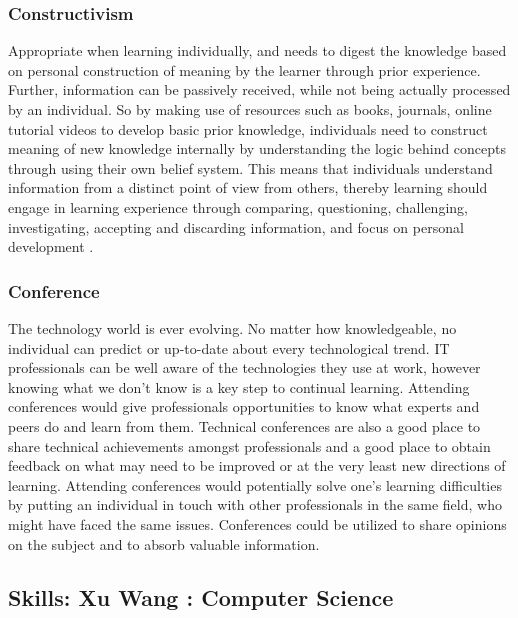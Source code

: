 \documentclass[a4paper, 11pt]{report}
\begin{document}
\subsubsection{Constructivism}
 Appropriate when learning individually, and needs to digest the knowledge based on personal construction of meaning by the learner through prior experience. Further, information can be passively received, while not being actually processed by an individual. So by making use of resources such as books, journals, online tutorial videos to develop basic prior knowledge, individuals need to construct meaning of new knowledge internally by understanding the logic behind concepts through using their own belief system. This means that individuals understand information from a distinct point of view from others, thereby learning should engage in learning experience through comparing, questioning, challenging, investigating, accepting and discarding information, and focus on personal development \cite{cooperstein2004beyond}.

 
\subsubsection{Conference}
The technology world is ever evolving. No matter how knowledgeable, no individual can predict or up-to-date about every technological trend. IT professionals can be well aware of the technologies they use at work, however knowing what we don’t know is a key step to continual learning. Attending conferences would give professionals opportunities to know what experts and peers do and learn from them. Technical conferences are also a good place to share technical achievements amongst professionals and a good place to obtain feedback on what may need to be improved or at the very least new directions of learning. Attending conferences would potentially solve one’s learning difficulties by putting an individual in touch with other professionals in the same field, who might have faced the same issues. Conferences could be utilized to share opinions on the subject and to absorb valuable information.



\subsection{Skills: Xu Wang : Computer Science}
\end{document}
